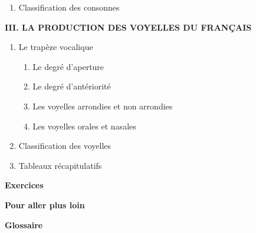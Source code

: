 \begin{keybox}
\begin{enumerate}[label=\arabic*.]
\begin{enumerate}[label=\textcircled{\scriptsize\arabic*}]
\begin{enumerate}[label=\arabic*.]
\item Les lieux d’articulation
\item Les articulateurs
\end{enumerate}
\item Le mode d’articulation
\end{enumerate}
\item Classification des consonnes
\end{enumerate}
\textbf{III. LA PRODUCTION DES VOYELLES DU FRANÇAIS}
\begin{enumerate}[label=\arabic*.]
\item Le trapèze vocalique
\begin{enumerate}[label=\textcircled{\scriptsize\arabic*}]
\item Le degré d’aperture
\item Le degré d’antériorité
\item Les voyelles arrondies et non arrondies
\item Les voyelles orales et nasales
\end{enumerate}
\item Classification des voyelles
\item Tableaux récapitulatifs
\end{enumerate}
\textbf{Exercices}\par
\textbf{Pour aller plus loin}\par
\textbf{Glossaire}
\end{keybox}

